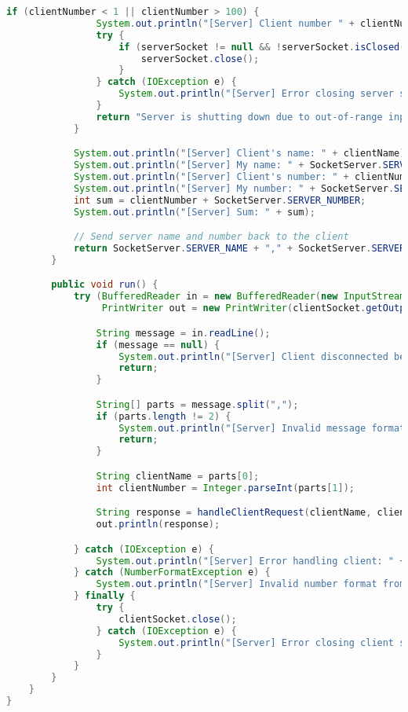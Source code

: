 \documentclass{article}
\begin{document}
\begin{lstlisting}[language=Java, caption={SocketServer.java - Multi-threaded Server}]
            if (clientNumber < 1 || clientNumber > 100) {
                System.out.println("[Server] Client number " + clientNumber + " is out of range. Shutting down server.");
                try {
                    if (serverSocket != null && !serverSocket.isClosed()) {
                        serverSocket.close();
                    }
                } catch (IOException e) {
                    System.out.println("[Server] Error closing server socket: " + e.getMessage());
                }
                return "Server is shutting down due to out-of-range input.";
            }

            System.out.println("[Server] Client's name: " + clientName);
            System.out.println("[Server] My name: " + SocketServer.SERVER_NAME);
            System.out.println("[Server] Client's number: " + clientNumber);
            System.out.println("[Server] My number: " + SocketServer.SERVER_NUMBER);
            int sum = clientNumber + SocketServer.SERVER_NUMBER;
            System.out.println("[Server] Sum: " + sum);

            // Send server name and number back to the client
            return SocketServer.SERVER_NAME + "," + SocketServer.SERVER_NUMBER;
        }

        public void run() {
            try (BufferedReader in = new BufferedReader(new InputStreamReader(clientSocket.getInputStream()));
                 PrintWriter out = new PrintWriter(clientSocket.getOutputStream(), true)) {

                String message = in.readLine();
                if (message == null) {
                    System.out.println("[Server] Client disconnected before sending a message.");
                    return;
                }

                String[] parts = message.split(",");
                if (parts.length != 2) {
                    System.out.println("[Server] Invalid message format from client.");
                    return;
                }

                String clientName = parts[0];
                int clientNumber = Integer.parseInt(parts[1]);

                String response = handleClientRequest(clientName, clientNumber);
                out.println(response);

            } catch (IOException e) {
                System.out.println("[Server] Error handling client: " + e.getMessage());
            } catch (NumberFormatException e) {
                System.out.println("[Server] Invalid number format from client.");
            } finally {
                try {
                    clientSocket.close();
                } catch (IOException e) {
                    System.out.println("[Server] Error closing client socket: " + e.getMessage());
                }
            }
        }
    }
}
\end{lstlisting}
\end{document}
